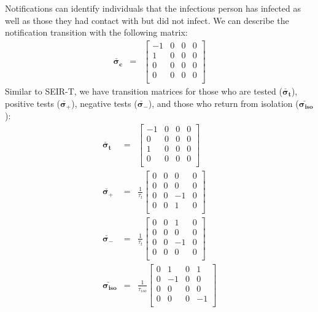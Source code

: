 \documentclass[notitlepage, superscriptaddress]{revtex4-2}
\begin{document}
Notifications can identify individuals that the infectious person has infected as well as those they had contact with but did not infect. We can describe the notification transition with the following matrix:
\begin{eqnarray} 
\boldsymbol{\check{\sigma_{c}}} &=& 
    \begin{bmatrix}
    -1 & 0 & 0 & 0\\ 
    1 & 0 & 0 & 0\\
    0 & 0 & 0 & 0\\
    0 & 0 & 0 & 0\\
    \end{bmatrix}
\end{eqnarray}
Similar to SEIR-T, we have transition matrices for those who are tested ($\boldsymbol{\check{\sigma_{t}}}$), positive tests ($\boldsymbol{\check{\sigma_{+}}}$), negative tests ($\boldsymbol{\check{\sigma_{-}}}$), and those who return from isolation ($\boldsymbol{\check{\sigma_{iso}}}$):
\begin{eqnarray}
\boldsymbol{\check{\sigma_{t}}} &=& 
    \begin{bmatrix}
    -1 & 0 & 0 & 0  \\ 
    0 & 0 & 0 & 0   \\
    1 & 0 & 0 & 0   \\
    0 & 0 & 0 & 0   \\
    \end{bmatrix}   \\
%
\boldsymbol{\check{\sigma_{+}}} &=& \frac{1}{\tau_{t}}
    \begin{bmatrix}
    0 & 0 & 0 & 0   \\ 
    0 & 0 & 0 & 0   \\
    0 & 0 & -1 & 0  \\
    0 & 0 & 1 & 0   \\
    \end{bmatrix}   \\ 
%
\boldsymbol{\check{\sigma_{-}}} &=& \frac{1}{\tau_{t}}
    \begin{bmatrix}
    0 & 0 & 1 & 0   \\ 
    0 & 0 & 0 & 0   \\
    0 & 0 & -1 & 0  \\
    0 & 0 & 0 & 0   \\
    \end{bmatrix}   \\ 
%
\boldsymbol{\check{\sigma_{iso}}} &=& \frac{1}{\tau_{iso}}
    \begin{bmatrix}
    0 & 1 & 0 & 1   \\ 
    0 & -1 & 0 & 0  \\
    0 & 0 & 0 & 0   \\
    0 & 0 & 0 & -1  \\
    \end{bmatrix}
\end{eqnarray}
\end{document}
